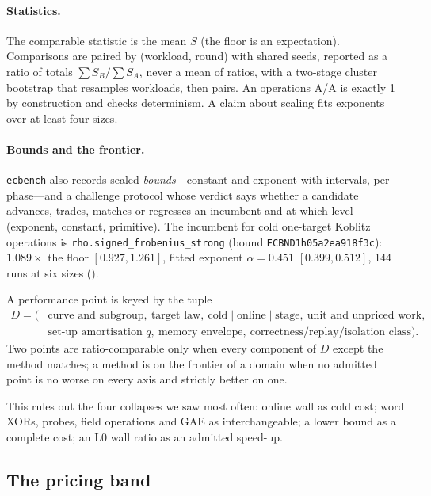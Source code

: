 \paragraph{Statistics.} The comparable statistic is the mean $S$ (the
floor is an expectation). Comparisons are paired by (workload, round) with
shared seeds, reported as a ratio of totals $\sum S_B/\sum S_A$, never a
mean of ratios, with a two-stage cluster bootstrap that resamples
workloads, then pairs. An operations A/A is exactly 1 by construction and
checks determinism. A claim about scaling fits exponents over at least
four sizes.

\paragraph{Bounds and the frontier.} \texttt{ecbench} also records sealed
\emph{bounds}---constant and exponent with intervals, per phase---and a
challenge protocol whose verdict says whether a candidate advances,
trades, matches or regresses an incumbent and at which level (exponent,
constant, primitive). The incumbent for cold one-target Koblitz operations
is \texttt{rho.signed\_frobenius\_strong} (bound
\texttt{ECBND1h05a2ea918f3c}): $1.089\times$ the floor $[0.927,1.261]$,
fitted exponent $\alpha=0.451$ $[0.399,0.512]$, 144 runs at six sizes
().

\begin{definition}[comparability]\label{def:domain}
A performance point is keyed by the tuple
\begin{align*}
D=\bigl(&\text{curve and subgroup},\ \text{target law},\
  \text{cold}\mid\text{online}\mid\text{stage},\ \text{unit and unpriced work},\\
  &\text{set-up amortisation }q,\ \text{memory envelope},\
  \text{correctness/replay/isolation class}\bigr).
\end{align*}
Two points are ratio-comparable only when every component of $D$ except
the method matches; a method is on the frontier of a domain when no admitted point is
no worse on every axis and strictly better on one.
\end{definition}
\noindent This rules out the four collapses we saw most often: online wall
as cold cost; word XORs, probes, field operations and GAE as
interchangeable; a lower bound as a complete cost; an L0 wall ratio as an
admitted speed-up.

\subsection{The pricing band}\label{sec:band}


